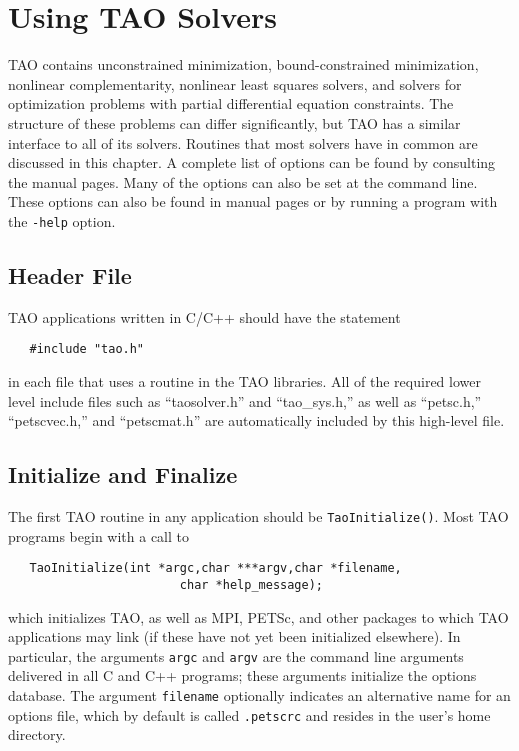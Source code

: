 %
%

\chapter{Using TAO Solvers}
\label{chapter:tao_solver}

TAO contains unconstrained minimization, bound-constrained minimization, 
nonlinear complementarity, nonlinear least squares solvers, and solvers
for optimization problems with partial differential equation constraints.
The structure of these problems can differ significantly, but TAO has a 
similar interface to all of its solvers.  
Routines that most solvers have in common are discussed in 
this chapter.
A complete list of options can be found by consulting the manual pages.
Many of the options can also be set at the command line.  These options
can also be found in manual pages or by
running a program with the {\tt -help} option.

\section{Header File}

TAO applications written in C/C++ should have the statement 
\begin{verbatim}
   #include "tao.h"
\end{verbatim}
\noindent
in each file that uses a routine in the TAO libraries.
All of the required lower level include files such as ``taosolver.h''
and ``tao\_sys.h,'' as well as ``petsc.h,'' ``petscvec.h,'' and
``petscmat.h''
are automatically included by this high-level file.


\section{Initialize and Finalize}

The first TAO routine in any application should be {\tt TaoInitialize()}.
Most TAO programs begin with a call to
\begin{verbatim}
   TaoInitialize(int *argc,char ***argv,char *filename, 
                        char *help_message);
\end{verbatim}
which initializes TAO, as well as MPI, PETSc, and other packages
to which TAO applications may link (if these have not yet
been initialized elsewhere).  
In particular, the arguments {\tt argc} and 
{\tt argv} are the command line arguments delivered in all C and C++
programs; these arguments initialize the options database.  
 The argument {\tt filename}
optionally indicates an alternative name for an options file, which by
default is called {\tt .petscrc} and resides in the user's home directory.

